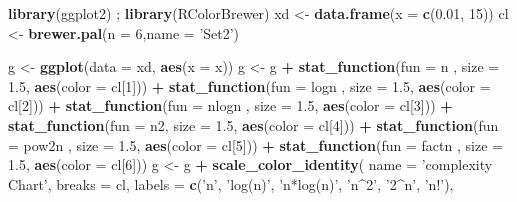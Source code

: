 \documentclass[]{article}
\newenvironment{Shaded}{\begin{snugshade}}{\end{snugshade}}
\newcommand{\KeywordTok}[1]{\textcolor[rgb]{0.13,0.29,0.53}{\textbf{#1}}}
\newcommand{\DataTypeTok}[1]{\textcolor[rgb]{0.13,0.29,0.53}{#1}}
\newcommand{\DecValTok}[1]{\textcolor[rgb]{0.00,0.00,0.81}{#1}}
\newcommand{\FloatTok}[1]{\textcolor[rgb]{0.00,0.00,0.81}{#1}}
\newcommand{\StringTok}[1]{\textcolor[rgb]{0.31,0.60,0.02}{#1}}
\newcommand{\OperatorTok}[1]{\textcolor[rgb]{0.81,0.36,0.00}{\textbf{#1}}}
\newcommand{\NormalTok}[1]{#1}
\begin{document}
\begin{Shaded}
\begin{Highlighting}[]
\KeywordTok{library}\NormalTok{(ggplot2) ; }\KeywordTok{library}\NormalTok{(RColorBrewer)}
\NormalTok{xd <-}\StringTok{ }\KeywordTok{data.frame}\NormalTok{(}\DataTypeTok{x =} \KeywordTok{c}\NormalTok{(}\FloatTok{0.01}\NormalTok{, }\DecValTok{15}\NormalTok{))}
\NormalTok{cl <-}\StringTok{ }\KeywordTok{brewer.pal}\NormalTok{(}\DataTypeTok{n =} \DecValTok{6}\NormalTok{,}\DataTypeTok{name =} \StringTok{'Set2'}\NormalTok{)}

\NormalTok{g <-}\StringTok{ }\KeywordTok{ggplot}\NormalTok{(}\DataTypeTok{data =}\NormalTok{ xd, }\KeywordTok{aes}\NormalTok{(}\DataTypeTok{x =}\NormalTok{ x))}
\NormalTok{g <-}\StringTok{ }\NormalTok{g }\OperatorTok{+}\StringTok{ }\KeywordTok{stat_function}\NormalTok{(}\DataTypeTok{fun =}\NormalTok{ n , }\DataTypeTok{size =} \FloatTok{1.5}\NormalTok{, }\KeywordTok{aes}\NormalTok{(}\DataTypeTok{color =}\NormalTok{ cl[}\DecValTok{1}\NormalTok{])) }\OperatorTok{+}
\StringTok{      }\KeywordTok{stat_function}\NormalTok{(}\DataTypeTok{fun =}\NormalTok{ logn , }\DataTypeTok{size =} \FloatTok{1.5}\NormalTok{, }\KeywordTok{aes}\NormalTok{(}\DataTypeTok{color =}\NormalTok{ cl[}\DecValTok{2}\NormalTok{])) }\OperatorTok{+}
\StringTok{      }\KeywordTok{stat_function}\NormalTok{(}\DataTypeTok{fun =}\NormalTok{ nlogn , }\DataTypeTok{size =} \FloatTok{1.5}\NormalTok{, }\KeywordTok{aes}\NormalTok{(}\DataTypeTok{color =}\NormalTok{ cl[}\DecValTok{3}\NormalTok{])) }\OperatorTok{+}
\StringTok{      }\KeywordTok{stat_function}\NormalTok{(}\DataTypeTok{fun =}\NormalTok{ n2, }\DataTypeTok{size =} \FloatTok{1.5}\NormalTok{, }\KeywordTok{aes}\NormalTok{(}\DataTypeTok{color =}\NormalTok{ cl[}\DecValTok{4}\NormalTok{])) }\OperatorTok{+}
\StringTok{      }\KeywordTok{stat_function}\NormalTok{(}\DataTypeTok{fun =}\NormalTok{ pow2n , }\DataTypeTok{size =} \FloatTok{1.5}\NormalTok{, }\KeywordTok{aes}\NormalTok{(}\DataTypeTok{color =}\NormalTok{ cl[}\DecValTok{5}\NormalTok{])) }\OperatorTok{+}
\StringTok{      }\KeywordTok{stat_function}\NormalTok{(}\DataTypeTok{fun =}\NormalTok{ factn , }\DataTypeTok{size =} \FloatTok{1.5}\NormalTok{, }\KeywordTok{aes}\NormalTok{(}\DataTypeTok{color =}\NormalTok{ cl[}\DecValTok{6}\NormalTok{]))}
\NormalTok{g <-}\StringTok{ }\NormalTok{g }\OperatorTok{+}\StringTok{ }\KeywordTok{scale_color_identity}\NormalTok{(}
      \DataTypeTok{name =} \StringTok{'complexity Chart'}\NormalTok{,}
      \DataTypeTok{breaks =}\NormalTok{ cl,}
      \DataTypeTok{labels =} \KeywordTok{c}\NormalTok{(}\StringTok{'n'}\NormalTok{, }\StringTok{'log(n)'}\NormalTok{, }\StringTok{'n*log(n)'}\NormalTok{, }\StringTok{'n^2'}\NormalTok{, }\StringTok{'2^n'}\NormalTok{, }\StringTok{'n!'}\NormalTok{),}

\end{Highlighting}
\end{Shaded}
\end{document}
